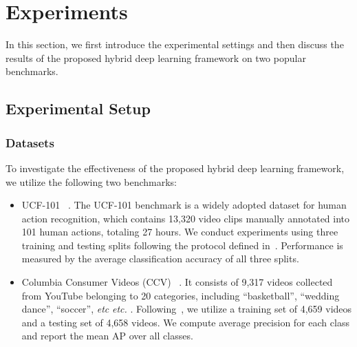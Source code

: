 \documentclass[journal]{IEEEtran}
\makeatletter
\newcommand*{\etc}{%
    \@ifnextchar{.}%
        {\emph{etc}}%
        {\emph{etc.}\@\xspace}%
}
\makeatother
\begin{document}

\section{Experiments}
\label{sec:exp}
In this section, we first introduce the experimental settings and then discuss the results of the proposed hybrid deep learning framework on two popular benchmarks.
\subsection{Experimental Setup}
\subsubsection{Datasets}
To investigate the effectiveness of the proposed hybrid deep learning framework, we utilize the following two benchmarks:
\begin{itemize} 

\item{UCF-101} ~\cite{ucf101}. The UCF-101 benchmark is a widely adopted dataset for human action recognition, which contains 13,320 video clips manually annotated into 101 human actions, totaling 27 hours. We conduct experiments using three training and testing splits following the protocol defined in~\cite{THUMOS14}. Performance is measured by the average classification accuracy of all three splits.

\item{Columbia Consumer Videos (CCV)} ~\cite{icmr11:consumervideo}. It consists of 9,317 videos collected from YouTube belonging to 20 categories, including ``basketball'', ``wedding dance'', ``soccer'', \etc.  Following~\cite{icmr11:consumervideo}, we utilize a training set of 4,659 videos and a testing set of 4,658 videos. We compute average precision for each class and report the mean AP over all classes.

\end{itemize}
\end{document}

